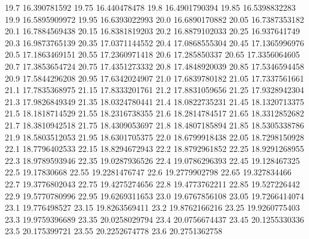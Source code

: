            19.7     16.390781592
          19.75     16.440478478
           19.8    16.4901790394
          19.85    16.5398832283
           19.9    16.5895909972
          19.95    16.6393022993
           20.0    16.6890170882
          20.05    16.7387353182
           20.1    16.7884569438
          20.15    16.8381819203
           20.2    16.8879102033
          20.25     16.937641749
           20.3    16.9873765139
          20.35    17.0371144552
           20.4    17.0868555304
          20.45    17.1365996976
           20.5    17.1863469151
          20.55    17.2360971418
           20.6     17.285850337
          20.65    17.3356064605
           20.7    17.3853654724
          20.75    17.4351273332
           20.8    17.4848920039
          20.85    17.5346594458
           20.9    17.5844296208
          20.95    17.6342024907
           21.0    17.6839780182
          21.05    17.7337561661
           21.1    17.7835368975
          21.15    17.8333201761
           21.2    17.8831059656
          21.25    17.9328942304
           21.3    17.9826849349
          21.35    18.0324780441
           21.4    18.0822735231
          21.45    18.1320713375
           21.5    18.1818714529
          21.55    18.2316738355
           21.6    18.2814784517
          21.65    18.3312852682
           21.7    18.3810942518
          21.75    18.4309053697
           21.8    18.4807185894
          21.85    18.5305338786
           21.9    18.5803512053
          21.95    18.6301705375
           22.0    18.6799918438
          22.05    18.7298150928
           22.1    18.7796402533
          22.15    18.8294672943
           22.2    18.8792961852
          22.25    18.9291268955
           22.3    18.9789593946
          22.35    19.0287936526
           22.4    19.0786296393
          22.45     19.128467325
           22.5      19.17830668
          22.55    19.2281476747
           22.6    19.2779902798
          22.65     19.327834466
           22.7    19.3776802043
          22.75    19.4275274656
           22.8    19.4773762211
          22.85     19.527226442
           22.9    19.5770780996
          22.95    19.6269311653
           23.0    19.6767856108
          23.05    19.7266414074
           23.1     19.776498527
          23.15    19.8263569411
           23.2    19.8762166216
          23.25    19.9260775403
           23.3    19.9759396689
          23.35    20.0258029794
           23.4    20.0756674437
          23.45    20.1255330336
           23.5     20.175399721
          23.55    20.2252674778
           23.6    20.2751362758
